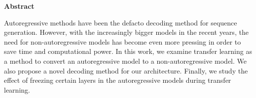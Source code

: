 \thispagestyle{plain}
\begin{center}
    \vspace{0.9cm}
        \textbf{\Large{Abstract}}
\end{center}

Autoregressive methods have been the defacto decoding method for sequence generation. However, with the increasingly bigger models in the recent years, the need for non-autoregressive models has become even more pressing in order to save time and computational power. In this work, we examine transfer learning as a method to convert an autoregressive model to a non-autoregressive model. We also propose a novel decoding method for our architecture. Finally, we study the effect of freezing certain layers in the autoregressive models during transfer learning.